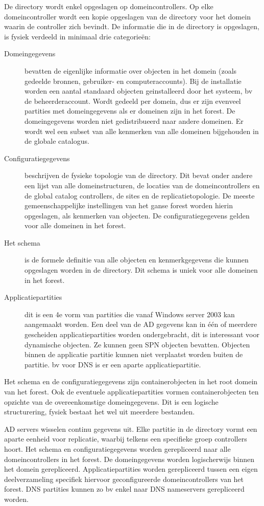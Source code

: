 De directory wordt enkel opgeslagen op domeincontrollers. Op elke
domeincontroller wordt een kopie opgeslagen van de directory voor het domein
waarin de controller zich bevindt. De informatie die in de directory is
opgeslagen, is fysiek verdeeld in minimaal drie categorieën: 
\begin{description}
	\item[Domeingegevens] bevatten de eigenlijke informatie over objecten in
		het domein (zoals gedeelde bronnen, gebruiker- en
		computeraccounts). Bij de installatie worden een aantal
		standaard objecten geinstalleerd door het systeem, bv de
		beheerderaccount. Wordt gedeeld per domein, dus er zijn evenveel
		partities met domeingegevens als er domeinen zijn in het forest.
		De domeingegevens worden niet gedistribueerd naar andere
		domeinen. Er wordt wel een subset van alle kenmerken van alle
		domeinen bijgehouden in de globale catalogus.
	\item[Configuratiegegevens] beschrijven de fysieke topologie van de
		directory. Dit bevat onder andere een lijst van alle
		domeinstructuren, de locaties van de domeincontrollers en de
		global catalog controllers, de sites en de replicatietopologie.
		De meeste gemeenschappelijke instellingen van het ganse forest
		worden hierin opgeslagen, als kenmerken van objecten. De
		configuratiegegevens gelden voor alle domeinen in het forest.
	\item[Het schema] is de formele definitie van alle objecten en
		kenmerkgegevens die kunnen opgeslagen worden in de directory.
		Dit schema is uniek voor alle domeinen in het forest.
	\item[Applicatiepartities] dit is een 4e vorm van partities die vanaf
		Windows server 2003 kan aangemaakt worden. Een deel van de AD
		gegevens kan in één of meerdere gescheiden applicatiepartities
		worden ondergebracht, dit is interessant voor dynamische
		objecten. Ze kunnen geen SPN objecten bevatten.  Objecten binnen
		de applicatie partitie kunnen niet verplaatst worden buiten de
		partitie. bv voor DNS is er een aparte applicatiepartitie.
\end{description}

Het schema en de configuratiegegevens zijn containerobjecten in het root domein
van het forest. Ook de eventuele applicatiepartities vormen containerobjecten
ten opzichte van de overeenkomstige domeingegevens. Dit is een logische
structurering, fysiek bestaat het wel uit meerdere bestanden.

AD servers wisselen continu gegevens uit. Elke partitie in de directory vormt
een aparte eenheid voor replicatie, waarbij telkens een specifieke groep
controllers hoort. Het schema en configuratiegegevens worden gerepliceerd naar
alle domeincontrollers in het forest. De domeingegevens worden logischerwijs
binnen het domein gerepliceerd. Applicatiepartities worden gerepliceerd tussen
een eigen deelverzameling specifiek hiervoor geconfigureerde domeincontrollers
van het forest. DNS partities kunnen zo bv enkel naar DNS nameservers
gerepliceerd worden.

